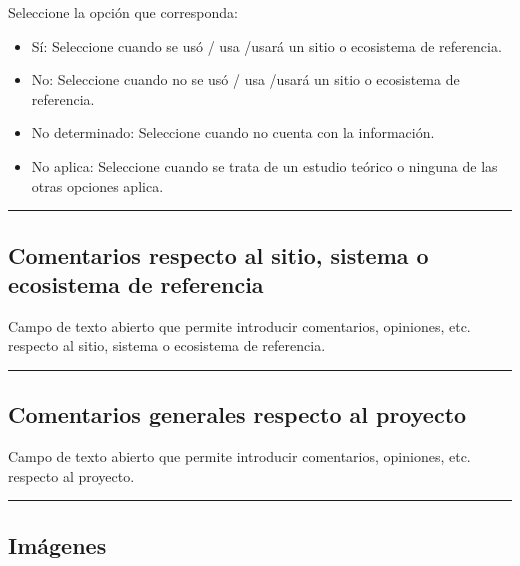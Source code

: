 \documentclass[
]{book}
\providecommand{\tightlist}{%
  \setlength{\itemsep}{0pt}\setlength{\parskip}{0pt}}
\begin{document}
Seleccione la opción que corresponda:

\begin{itemize}
\tightlist
\item
  Sí: Seleccione cuando se usó / usa /usará un sitio o ecosistema de referencia.
\item
  No: Seleccione cuando no se usó / usa /usará un sitio o ecosistema de referencia.
\item
  No determinado: Seleccione cuando no cuenta con la información.
\item
  No aplica: Seleccione cuando se trata de un estudio teórico o ninguna de las otras opciones aplica.
\end{itemize}

\begin{center}\rule{0.5\linewidth}{0.5pt}\end{center}

\hypertarget{comentarios-respecto-al-sitio-sistema-o-ecosistema-de-referencia}{%
\subsection*{Comentarios respecto al sitio, sistema o ecosistema de referencia}\label{comentarios-respecto-al-sitio-sistema-o-ecosistema-de-referencia}}

Campo de texto abierto que permite introducir comentarios, opiniones, etc. respecto al sitio, sistema o ecosistema de referencia.

\begin{center}\rule{0.5\linewidth}{0.5pt}\end{center}

\hypertarget{comentarios-generales-respecto-al-proyecto}{%
\subsection*{Comentarios generales respecto al proyecto}\label{comentarios-generales-respecto-al-proyecto}}

Campo de texto abierto que permite introducir comentarios, opiniones, etc. respecto al proyecto.

\begin{center}\rule{0.5\linewidth}{0.5pt}\end{center}

\hypertarget{imuxe1genes}{%
\subsection*{Imágenes}\label{imuxe1genes}}
\end{document}
